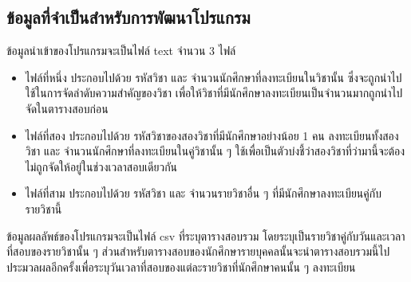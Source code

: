 \subsection{ข้อมูลที่จำเป็นสำหรับการพัฒนาโปรแกรม}
ข้อมูลนำเข้าของโปรแกรมจะเป็นไฟล์ text จำนวน 3 ไฟล์
\begin{itemize}
  \item ไฟล์ที่หนึ่ง ประกอบไปด้วย รหัสวิชา และ จำนวนนักศึกษาที่ลงทะเบียนในวิชานั้น ซึ่งจะถูกนำไปใช้ในการจัดลำดับความสำคัญของวิชา
  เพื่อให้วิชาที่มีนักศึกษาลงทะเบียนเป็นจำนวนมากถูกนำไปจัดในตารางสอบก่อน
  \item ไฟล์ที่สอง ประกอบไปด้วย รหัสวิชาของสองวิชาที่มีนักศึกษาอย่างน้อย 1 คน ลงทะเบียนทั้งสองวิชา และ จำนวนนักศึกษาที่ลงทะเบียนในคู่วิชานั้น ๆ 
  ใช้เพื่อเป็นตัวบ่งชี้ว่าสองวิชาที่ว่ามานี้จะต้องไม่ถูกจัดให้อยู่ในช่วงเวลาสอบเดียวกัน
  \item ไฟล์ที่สาม ประกอบไปด้วย รหัสวิชา และ จำนวนรายวิชาอื่น ๆ ที่มีนักศึกษาลงทะเบียนคู่กับรายวิชานี้
\end{itemize}

ข้อมูลผลลัพธ์ของโปรแกรมจะเป็นไฟล์ csv ที่ระบุตารางสอบรวม โดยระบุเป็นรายวิชาคู่กับวันและเวลาที่สอบของรายวิชานั้น ๆ
ส่วนสำหรับตารางสอบของนักศึกษารายบุคคลนั้นจะนำตารางสอบรวมนี้ไปประมวลผลอีกครั้งเพื่อระบุวันเวลาที่สอบของแต่ละรายวิชาที่นักศึกษาคนนั้น ๆ ลงทะเบียน




